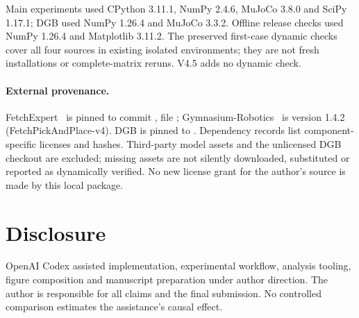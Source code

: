 \documentclass[10pt]{article}
\begin{document}
Main experiments used CPython 3.11.1, NumPy 2.4.6, MuJoCo 3.8.0 and SciPy
1.17.1; DGB used NumPy 1.26.4 and MuJoCo 3.3.2. Offline release checks used
NumPy 1.26.4 and Matplotlib 3.11.2. The preserved first-case dynamic checks
cover all four sources in existing isolated environments; they are not
fresh installations or complete-matrix reruns. V4.5 adds no dynamic check.

\paragraph{External provenance.}
FetchExpert~\citep{fetch_expert} is pinned to commit
, file
; Gymnasium-Robotics~\citep{gymnasium_robotics}
is version 1.4.2 (FetchPickAndPlace-v4). DGB is pinned to
. Dependency records list
component-specific licenses and hashes. Third-party model assets and the
unlicensed DGB checkout are excluded; missing assets are not silently
downloaded, substituted or reported as dynamically verified. No new license
grant for the author's source is made by this local package.

\section{Disclosure}
OpenAI Codex assisted implementation, experimental workflow, analysis tooling,
figure composition and manuscript preparation under author direction. The
author is responsible for all claims and the final submission. No controlled
comparison estimates the assistance's causal effect.

\FloatBarrier
\begingroup
\small
\setlength{\bibsep}{2pt}


\endgroup
\end{document}
